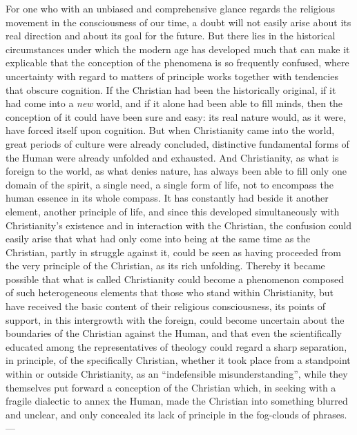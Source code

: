 \documentclass[12pt,a4paper,openany]{book}
\newcommand{\opage}[1]{\marginnote{\footnotesize\textit{[#1]}}}
\begin{document}
For one who with an unbiased and comprehensive glance regards
the religious movement in the consciousness of our time,
a doubt will not easily arise about its real direction
and about its goal for the future. But there lies in the
historical circumstances under which the modern age has developed
much that can make it explicable that the conception of the
phenomena is so frequently confused, where uncertainty with
regard to matters of principle works together with tendencies
that obscure cognition. If the Christian had been
the historically original, if it had come into a \emph{new}
world, and if it alone had been able to fill minds, then
the conception of it could have been sure and easy: its
real nature would, as it were, have forced itself upon cognition.
But when Christianity came into the world,
great periods of culture were already concluded, distinctive fundamental forms
of the Human were already unfolded and exhausted.
And Christianity, as what is foreign to the world, as what
denies nature, has always been able to fill only one domain
of the spirit, a single need, a single form of life, not to encompass
the human essence in its whole compass. It has
constantly had beside it another element, another
principle of life, and since this developed simultaneously with Christianity's
existence and in interaction with the
Christian, the confusion could easily arise that what had only
\opage{299}come into being at the same time as the Christian, partly in
struggle against it, could be seen as having proceeded from the very principle of the
Christian, as its rich unfolding. Thereby it became
possible that what is called Christianity could become a phenomenon
composed of such heterogeneous elements that those who
stand within Christianity, but have received the basic content of their
religious consciousness, its points of support, in
this intergrowth with the foreign, could become
uncertain about the boundaries of the Christian against the Human, and
that even the scientifically educated among the representatives of theology
could regard a sharp separation, in principle, of
the specifically Christian, whether it took place from a
standpoint within or outside Christianity, as an
``indefensible misunderstanding'', while they themselves put forward a
conception of the Christian which, in seeking with a fragile
dialectic to annex the Human, made the Christian
into something blurred and unclear, and only concealed its lack of principle
in the fog-clouds of phrases. ---
\end{document}
